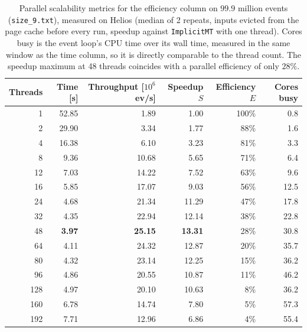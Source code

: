 \begin{table}[htbp]
\centering
\caption{Parallel scalability metrics for the efficiency column on $99.9$ million events (\texttt{size\_9.txt}), measured on Helios (median of 2 repeats, inputs evicted from the page cache before every run, speedup against \texttt{ImplicitMT} with one thread). Cores busy is the event loop's CPU time over its wall time, measured in the same window as the time column, so it is directly comparable to the thread count. The speedup maximum at 48 threads coincides with a parallel efficiency of only $28\%$.}
\label{tab:scalability-efficiency}
\begin{tabular}{rrrrrr}
\toprule
Threads & Time [s] & Throughput [$10^6$ ev/s] & Speedup $S$ & Efficiency $E$ & Cores busy \\
\midrule
 1 & 52.85 & 1.89 & 1.00 & 100\% & 0.8 \\
 2 & 29.90 & 3.34 & 1.77 & 88\% & 1.6 \\
 4 & 16.38 & 6.10 & 3.23 & 81\% & 3.3 \\
 8 & 9.36 & 10.68 & 5.65 & 71\% & 6.4 \\
12 & 7.03 & 14.22 & 7.52 & 63\% & 9.6 \\
16 & 5.85 & 17.07 & 9.03 & 56\% & 12.5 \\
24 & 4.68 & 21.34 & 11.29 & 47\% & 17.8 \\
32 & 4.35 & 22.94 & 12.14 & 38\% & 22.8 \\
48 & \textbf{3.97} & \textbf{25.15} & \textbf{13.31} & 28\% & 30.8 \\
64 & 4.11 & 24.32 & 12.87 & 20\% & 35.7 \\
80 & 4.32 & 23.14 & 12.25 & 15\% & 36.2 \\
96 & 4.86 & 20.55 & 10.87 & 11\% & 46.2 \\
128 & 4.97 & 20.10 & 10.63 & 8\% & 36.2 \\
160 & 6.78 & 14.74 & 7.80 & 5\% & 57.3 \\
192 & 7.71 & 12.96 & 6.86 & 4\% & 55.4 \\
\bottomrule
\end{tabular}
\end{table}
